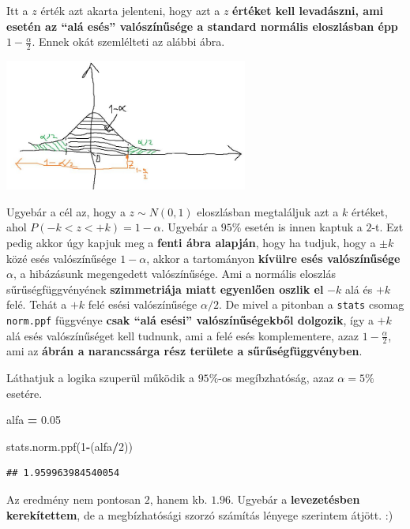 \documentclass[
]{book}
\newenvironment{Shaded}{\begin{snugshade}}{\end{snugshade}}
\newcommand{\DecValTok}[1]{\textcolor[rgb]{0.00,0.00,0.81}{#1}}
\newcommand{\FloatTok}[1]{\textcolor[rgb]{0.00,0.00,0.81}{#1}}
\newcommand{\NormalTok}[1]{#1}
\newcommand{\OperatorTok}[1]{\textcolor[rgb]{0.81,0.36,0.00}{\textbf{#1}}}
\begin{document}
Itt a \(z\) érték azt akarta jelenteni, hogy azt a \(z\) \textbf{értéket kell levadászni, ami esetén az ``alá esés'' valószínűsége a standard normális eloszlásban épp} \(1-\frac{\alpha}{2}\).
Ennek okát szemlélteti az alábbi ábra.

\includegraphics[width=0.6\textwidth,height=\textheight]{normal_ci.jpg}

Ugyebár a cél az, hogy a \(z \sim N(0,1)\) eloszlásban megtaláljuk azt a \(k\) értéket, ahol \(P(-k < z < +k)=1-\alpha\). Ugyebár a \(95\%\) esetén is innen kaptuk a \(2\)-t. Ezt pedig akkor úgy kapjuk meg a \textbf{fenti ábra alapján}, hogy ha tudjuk, hogy a \(\pm k\) közé esés valószínűsége \(1- \alpha\), akkor a tartományon \textbf{kívülre esés valószínűsége} \(\alpha\), a hibázásunk megengedett valószínűsége. Ami a normális eloszlás sűrűségfüggvényének \textbf{szimmetriája miatt egyenlően oszlik el} \(-k\) alá és \(+k\) felé. Tehát a \(+k\) felé esési valószínűsége \(\alpha / 2\). De mivel a pitonban a \texttt{stats} csomag \texttt{norm.ppf} függvénye \textbf{csak ``alá esési'' valószínűségekből dolgozik}, így a \(+k\) alá esés valószínűséget kell tudnunk, ami a felé esés komplementere, azaz \(1-\frac{\alpha}{2}\), ami az \textbf{ábrán a narancssárga rész területe a sűrűségfüggvényben}.

Láthatjuk a logika szuperül működik a \(95\%\)-os megíbzhatóság, azaz \(\alpha=5\%\) esetére.

\begin{Shaded}
\begin{Highlighting}[]
\NormalTok{alfa }\OperatorTok{=} \FloatTok{0.05}

\NormalTok{stats.norm.ppf(}\DecValTok{1}\OperatorTok{{-}}\NormalTok{(alfa}\OperatorTok{/}\DecValTok{2}\NormalTok{))}
\end{Highlighting}
\end{Shaded}

\begin{verbatim}
## 1.959963984540054
\end{verbatim}

Az eredmény nem pontosan \(2\), hanem kb. \(1.96\). Ugyebár a \textbf{levezetésben kerekítettem}, de a megbízhatósági szorzó számítás lényege szerintem átjött. :)
\end{document}
